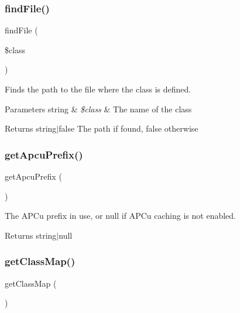\subsubsection{\texorpdfstring{find\+File()}{findFile()}}
{\footnotesize\ttfamily find\+File (\begin{DoxyParamCaption}\item[{}]{\$class }\end{DoxyParamCaption})}

Finds the path to the file where the class is defined.


\begin{DoxyParams}[1]{Parameters}
string & {\em \$class} & The name of the class\\
\hline
\end{DoxyParams}
\begin{DoxyReturn}{Returns}
string$\vert$false The path if found, false otherwise 
\end{DoxyReturn}
\mbox{\label{class_composer_1_1_autoload_1_1_class_loader_a570c1269e2a739a2849b7e579e7d83b9}} 
\subsubsection{\texorpdfstring{get\+Apcu\+Prefix()}{getApcuPrefix()}}
{\footnotesize\ttfamily get\+Apcu\+Prefix (\begin{DoxyParamCaption}{ }\end{DoxyParamCaption})}

The A\+P\+Cu prefix in use, or null if A\+P\+Cu caching is not enabled.

\begin{DoxyReturn}{Returns}
string$\vert$null 
\end{DoxyReturn}
\mbox{\label{class_composer_1_1_autoload_1_1_class_loader_a7e9a9730c400820ee2b1c995cd5134fe}} 
\subsubsection{\texorpdfstring{get\+Class\+Map()}{getClassMap()}}
{\footnotesize\ttfamily get\+Class\+Map (\begin{DoxyParamCaption}{ }\end{DoxyParamCaption})}

